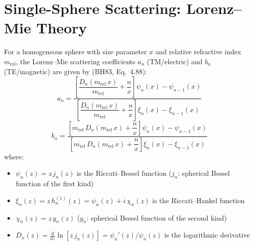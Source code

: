 \documentclass[11pt,a4paper]{article}
\begin{document}
\section{Single-Sphere Scattering: Lorenz--Mie Theory}
\label{sec:mie}

For a homogeneous sphere with size parameter $x$ and relative refractive index $m_\mathrm{rel}$, the Lorenz--Mie scattering coefficients $a_n$ (TM/electric) and $b_n$ (TE/magnetic) are given by (BH83, Eq.~4.88):
\begin{equation}
  a_n = \frac{\left[\dfrac{D_n(m_\mathrm{rel}\,x)}{m_\mathrm{rel}} + \dfrac{n}{x}\right] \psi_n(x) - \psi_{n-1}(x)}
             {\left[\dfrac{D_n(m_\mathrm{rel}\,x)}{m_\mathrm{rel}} + \dfrac{n}{x}\right] \xi_n(x) - \xi_{n-1}(x)}
  \label{eq:mie-an}
\end{equation}
\begin{equation}
  b_n = \frac{\left[m_\mathrm{rel}\,D_n(m_\mathrm{rel}\,x) + \dfrac{n}{x}\right] \psi_n(x) - \psi_{n-1}(x)}
             {\left[m_\mathrm{rel}\,D_n(m_\mathrm{rel}\,x) + \dfrac{n}{x}\right] \xi_n(x) - \xi_{n-1}(x)}
  \label{eq:mie-bn}
\end{equation}
where:
\begin{itemize}[nosep]
  \item $\psi_n(z) = z\,j_n(z)$ is the Riccati--Bessel function ($j_n$: spherical Bessel function of the first kind)
  \item $\xi_n(z) = z\,h_n^{(1)}(z) = \psi_n(z) + i\,\chi_n(z)$ is the Riccati--Hankel function
  \item $\chi_n(z) = z\,y_n(z)$ ($y_n$: spherical Bessel function of the second kind)
  \item $D_n(z) = \frac{d}{dz}\ln[z\,j_n(z)] = \psi_n'(z)/\psi_n(z)$ is the logarithmic derivative
\end{itemize}
\end{document}
